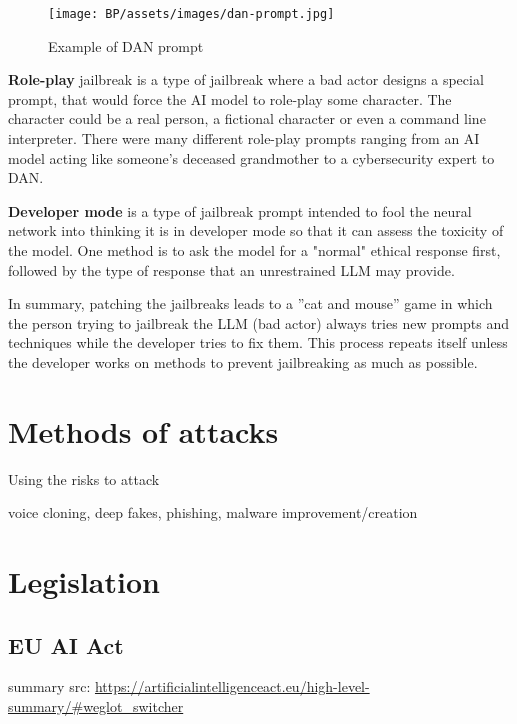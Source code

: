 \begin{figure}[ht]
\begin{centering}
\texttt{[image: BP/assets/images/dan-prompt.jpg]}
\par\end{centering}
\caption{Example of 
 DAN prompt\cite{reddit_pic}
 \label{fig:dan-prompt}}
\end{figure}


\textbf{Role-play} jailbreak is a type of jailbreak where a bad actor designs a special prompt, that would force the AI model to role-play some character. The character could be a real person, a fictional character or even a command line interpreter. There were many different role-play prompts ranging from an AI model acting like someone's deceased grandmother to a cybersecurity expert to DAN.


\textbf{Developer mode} is a type of jailbreak prompt intended to fool the neural network into thinking it is in developer mode so that it can assess the toxicity of the model. One method is to ask the model for a "normal" ethical response first, followed by the type of response that an unrestrained LLM may provide.


In summary, patching the jailbreaks leads to a ''cat and mouse'' game in which the person trying to jailbreak the LLM (bad actor) always tries new prompts and techniques while the developer tries to fix them. This process repeats itself unless the developer works on methods to prevent jailbreaking as much as possible.


\section{Methods of attacks}
Using the risks to attack

voice cloning, deep fakes, phishing, malware improvement/creation 

\section{Legislation} \label{sec:legislation}

\subsection{EU AI Act}
summary src: \url{https://artificialintelligenceact.eu/high-level-summary/#weglot_switcher}



